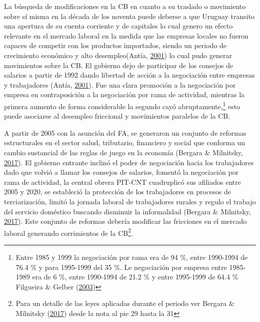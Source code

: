 \documentclass[12pt,oneside]{reedthesis}
\begin{document}
La búsqueda de modificaciones en la CB en cuanto a su traslado o movimiento sobre sí misma en la década de los noventa puede deberse a que Uruguay transito una apertura de su cuenta corriente y de capitales lo cual genero un efecto relevante en el mercado laboral en la medida que las empresas locales no fueron capaces de competir con los productos importados, siendo un periodo de crecimiento económico y alto desempleo(Antía, \protect\hyperlink{ref-Antia2001}{2001}) lo cual pudo generar movimientos sobre la CB. El gobierno dejo de participar de los consejos de salarios a partir de 1992 dando libertad de acción a la negociación entre empresas y trabajadores (Antía, \protect\hyperlink{ref-Antia2001}{2001}). Fue una clara promoción a la negociación por empresa en contraposición a la negociación por rama de actividad, mientras la primera aumento de forma considerable la segundo cayó abruptamente,\footnote{Entre 1985 y 1999 la negociación por rama era de 94 \%, entre 1990-1994 de 76.4 \% y para 1995-1999 del 35 \%. Le negociación por empresa entre 1985-1989 era de 6 \%, entre 1990-1994 de 21.2 \% y entre 1995-1999 de 64.4 \% Filgueira \& Gelber (\protect\hyperlink{ref-Filgueira2003}{2003})} esto puede asociarse al desempleo friccional y movimientos paralelos de la CB.

A partir de 2005 con la asunción del FA, se generaron un conjunto de reformas estructurales en el sector salud, tributario, financiero y social que conforma un cambio sustancial de las reglas de juego en la economía (Bergara \& Milnitsky, \protect\hyperlink{ref-Bergara2017}{2017}). El gobierno entrante inclinó el poder de negociación hacia los trabajadores dado que volvió a llamar los consejos de salarios, fomentó la negociación por rama de actividad, la central obrera PIT-CNT cuadruplicó sus afiliados entre 2005 y 2020, se estableció la protección de los trabajadores en procesos de terciarización, limitó la jornada laboral de trabajadores rurales y regulo el trabajo del servicio doméstico buscando disminuir la informalidad (Bergara \& Milnitsky, \protect\hyperlink{ref-Bergara2017}{2017}). Este conjunto de reformas debería modificar las fricciones en el mercado laboral generando corrimientos de la CB\footnote{Para un detalle de las leyes aplicadas durante el periodo ver Bergara \& Milnitsky (\protect\hyperlink{ref-Bergara2017}{2017}) desde la nota al pie 29 hasta la 31}.
\end{document}
